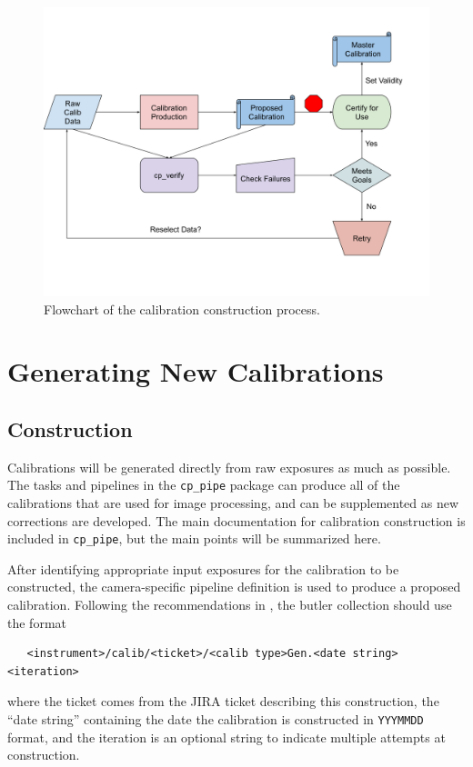 \documentclass[DM,authoryear,toc]{lsstdoc}
\begin{document}
\begin{figure}
  \includegraphics[width=\linewidth]{figures/flowchart.png}
  \caption{Flowchart of the calibration construction process.}
  \label{fig:flowchart}
\end{figure}


\section{Generating New Calibrations}

\subsection{Construction}

Calibrations will be generated directly from raw exposures as much as possible.  The tasks and pipelines in the \verb|cp_pipe| package can produce all of the calibrations that are used for image processing, and can be supplemented as new corrections are developed.  The main documentation for calibration construction is included in \verb|cp_pipe|, but the main points will be summarized here.

After identifying appropriate input exposures for the calibration to be constructed, the camera-specific pipeline definition is used to produce a proposed calibration.  Following the recommendations in , the butler collection should use the format
\begin{verbatim}
   <instrument>/calib/<ticket>/<calib type>Gen.<date string><iteration>
\end{verbatim}
\noindent where the ticket comes from the JIRA ticket describing this construction, the ``date string'' containing the date the calibration is constructed in \verb|YYYMMDD| format, and the iteration is an optional string to indicate multiple attempts at construction.
\end{document}
